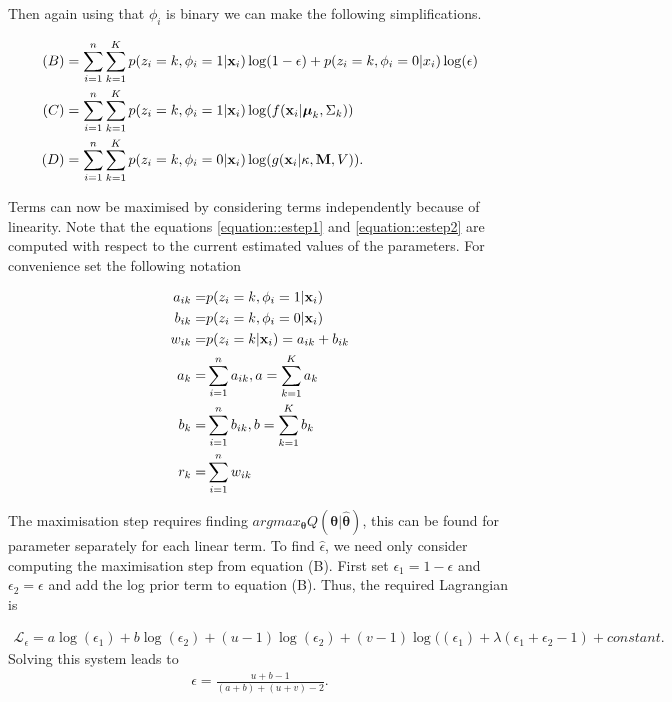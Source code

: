 \documentclass[12pt,english]{article}\usepackage[]{graphicx}\usepackage[]{color}
\begin{document}
Then again using that $\phi_i$ is binary we can make the following
simplifications.

\begin{equation}\label{equation::q}
\begin{split}
(B) & = \sum_{i=1}^{n} \sum_{k=1}^{K}p(z_i = k, \phi_i = 1|{\bf x}_i)\log(1 - \epsilon) + p(z_i = k, \phi_i = 0|x_i)\log(\epsilon)\\
(C) & = \sum_{i=1}^{n} \sum_{k=1}^{K}p(z_i = k, \phi_i = 1|{\bf x}_i)\log (f({\bf x}_i|\boldsymbol{\mu}_k, \Sigma_k))\\
(D)& = \sum_{i=1}^{n} \sum_{k=1}^{K}p(z_i = k, \phi_i = 0 |{\bf x}_i)\log( g({\bf x}_i|\kappa, {\bf M}, V)).\\
\end{split}
\end{equation}

Terms can now be maximised by considering terms independently because of linearity. Note that the equations \ref{equation::estep1} and \ref{equation::estep2} are computed with respect to the current estimated values of the parameters. For convenience set the following notation

\begin{equation}\label{equation::estepfinalapp}
\begin{split}
a_{ik} = & p(z_i = k, \phi_i = 1|{\bf x}_i)\\
b_{ik} = & p(z_i = k, \phi_i = 0|{\bf x}_i) \\
w_{ik} = & p(z_i = k|{\bf x}_i) = a_{ik} + b_{ik}\\
a_k = & \sum_{i=1}^{n}a_{ik}, a = \sum_{k=1}^{K}a_k \\
b_k = & \sum_{i=1}^{n}b_{ik}, b = \sum_{k=1}^{K}b_k \\
r_k = & \sum_{i=1}^{n}w_{ik}
\end{split}
\end{equation}

The maximisation step requires finding
$argmax_{\boldsymbol{\theta}}Q(\boldsymbol{\theta}|\boldsymbol{\hat{\theta}})$,
this can be found for parameter separately for each linear term. To
find $\hat{\epsilon}$, we need only consider computing the
maximisation step from equation (B). First set
$\epsilon_1 = 1 - \epsilon$ and $\epsilon_2 = \epsilon$ and add the
log prior term to equation (B). Thus, the required Lagrangian is

\begin{equation}
\begin{split}
\mathcal{L}_{\epsilon} = a\log(\epsilon_1) + b\log(\epsilon_2) + (u-1)\log(\epsilon_2) + (v-1)\log((\epsilon_1) + \lambda(\epsilon_1 + \epsilon_2 - 1) +  constant.
\end{split}
\end{equation}
Solving this system leads to
\begin{equation}
\begin{split}
\epsilon = \frac{ u + b - 1}{(a+b) + (u+v) - 2}.
\end{split}
\end{equation}
\end{document}
